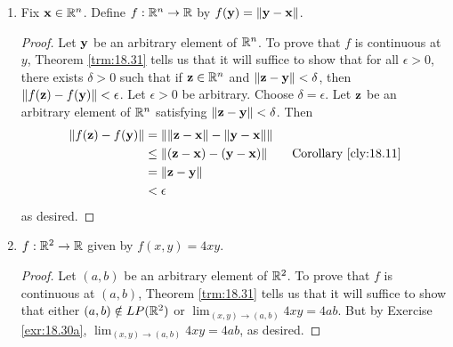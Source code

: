 \documentclass[../main.tex]{subfiles}
\begin{document}
\begin{exercise}
\begin{enumerate}[label={(\alph*)},ref={\theexercise\alph*}]
\begin{proof}
\begin{align*}
                \norm{f(y)-f(x)} &= \norm{y\mathbf{a}-x\mathbf{a}}\\
                \norm{(y-x)\mathbf{a}}\\
                &= |y-x|\cdot\norm{\mathbf{a}}\tag*{Theorem \ref{trm:18.10}}\\
                &< \frac{\epsilon}{\norm{\mathbf{a}}}\cdot\norm{\mathbf{a}}\\
                &= \epsilon
            \end{align*}
            as desired.
        \end{proof}
        \item \label{exr:18.32c}Fix $\mathbf{x}\in\mathbb{R}^n$. Define $f:\mathbb{R}^n\to\mathbb{R}$ by $f(\mathbf{y})=\norm{\mathbf{y}-\mathbf{x}}$.
        \begin{proof}
            Let $\mathbf{y}$ be an arbitrary element of $\mathbb{R}^n$. To prove that $f$ is continuous at $y$, Theorem \ref{trm:18.31} tells us that it will suffice to show that for all $\epsilon>0$, there exists $\delta>0$ such that if $\mathbf{z}\in\mathbb{R}^n$ and $\norm{\mathbf{z}-\mathbf{y}}<\delta$, then $\norm{f(\mathbf{z})-f(\mathbf{y})}<\epsilon$. Let $\epsilon>0$ be arbitrary. Choose $\delta=\epsilon$. Let $\mathbf{z}$ be an arbitrary element of $\mathbb{R}^n$ satisfying $\norm{\mathbf{z}-\mathbf{y}}<\delta$. Then
            \begin{align*}
                \norm{f(\z)-f(\y)} &= \norm{\norm{\z-\x}-\norm{\y-\x}}\\
                &\leq \norm{(\z-\x)-(\y-\x)}\tag*{Corollary \ref{cly:18.11}}\\
                &= \norm{\z-\y}\\
                &< \epsilon
            \end{align*}
            as desired.
        \end{proof}
        \item \label{exr:18.32d}$f:\mathbb{R}^2\to\mathbb{R}$ given by $f(x,y)=4xy$.
        \begin{proof}
            Let $(a,b)$ be an arbitrary element of $\mathbb{R}^2$. To prove that $f$ is continuous at $(a,b)$, Theorem \ref{trm:18.31} tells us that it will suffice to show that either $(a,b)\notin LP(\mathbb{R}^2)$ or $\lim_{(x,y)\to(a,b)}4xy=4ab$. But by Exercise \ref{exr:18.30a}, $\lim_{(x,y)\to(a,b)}4xy=4ab$, as desired.
        \end{proof}
    \end{enumerate}
\end{exercise}
\end{document}
